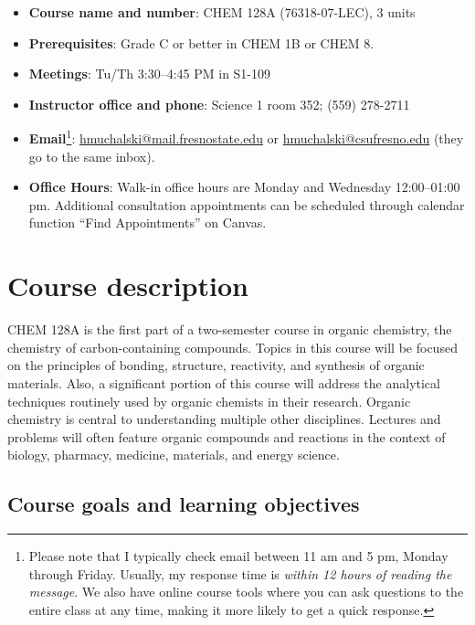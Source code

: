\begin{itemize}
\tightlist
\item
  \textbf{Course name and number}: CHEM 128A (76318-07-LEC), 3 units
\item
  \textbf{Prerequisites}: Grade C or better in CHEM 1B or CHEM 8.
\item
  \textbf{Meetings}: Tu/Th 3:30--4:45 PM in S1-109
\item
  \textbf{Instructor office and phone}: Science 1 room 352; (559)
  278-2711
\item
  \textbf{Email}\footnote{Please note that I typically check email
    between 11 am and 5 pm, Monday through Friday. Usually, my response
    time is \emph{within 12 hours of reading the message}. We also have
    online course tools where you can ask questions to the entire class
    at any time, making it more likely to get a quick response.}:
  \url{hmuchalski@mail.fresnostate.edu} or
  \url{hmuchalski@csufresno.edu} (they go to the same inbox).
\item
  \textbf{Office Hours}: Walk-in office hours are Monday and Wednesday
  12:00--01:00 pm. Additional consultation appointments can be scheduled
  through calendar function ``Find Appointments'' on Canvas.
\end{itemize}

\hypertarget{course-description}{%
\section{Course description}\label{course-description}}

CHEM 128A is the first part of a two-semester course in organic
chemistry, the chemistry of carbon-containing compounds. Topics in this
course will be focused on the principles of bonding, structure,
reactivity, and synthesis of organic materials. Also, a significant
portion of this course will address the analytical techniques routinely
used by organic chemists in their research. Organic chemistry is central
to understanding multiple other disciplines. Lectures and problems will
often feature organic compounds and reactions in the context of biology,
pharmacy, medicine, materials, and energy science.

\hypertarget{course-goals-and-learning-objectives}{%
\subsection{Course goals and learning
objectives}\label{course-goals-and-learning-objectives}}

